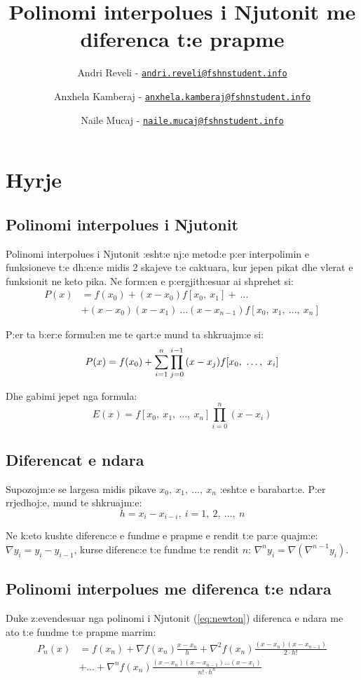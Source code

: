 \documentclass[12pt, margin=1in, a4paper]{article}
\title{Polinomi interpolues i Njutonit me diferenca t:e prapme}
\author{
    Andri Reveli - \href{mailto:andri.reveli@fshnstudent.info}{\texttt{andri.reveli@fshnstudent.info}}
    \and
    Anxhela Kamberaj - \href{mailto:anxhela.kamberaj@fshnstudent.info}{\texttt{anxhela.kamberaj@fshnstudent.info}}
    \and
    Naile Mucaj - \href{mailto:naile.mucaj@fshnstudent.info}{\texttt{naile.mucaj@fshnstudent.info}}
    \and
}
\begin{document}
\maketitle
\newpage

\tableofcontents
\newpage

\section{Hyrje}
  \subsection{Polinomi interpolues i Njutonit}
  Polinomi interpolues i Njutonit :esht:e nj:e metod:e p:er interpolimin e
  funksioneve t:e dh:en:e midis 2 skajeve t:e caktuara, kur jepen pikat dhe
  vlerat e funksionit ne keto pika. Ne form:en e p:ergjith:esuar ai
  shprehet si:
  \begin{equation}\label{eq:newton}
  \begin{aligned}
    P(x) &= f(x_0) + (x - x_0)f[x_0, \ x_1] + \ \dots \\
    &+ (x - x_0)(x - x_1) \ \dots (x - x_{n - 1})f[x_0, \ x_1, \ \dots, \ x_n]
  \end{aligned}
  \end{equation}

  P:er ta b:er:e formul:en me te qart:e mund ta shkruajm:e si:
  \[
    P(x) = f(x_0) + \sum_{i = 1}^{n}{\prod_{j = 0}^{i - 1}{(x - x_j)}f[x_0, \ \dots, \ x_i]} \\
  \]

  Dhe gabimi jepet nga formula:
  \[
    E(x) = f[x_0, \ x_1, \ \dots, \ x_n]\prod_{i = 0}^n{(x - x_i)}
  \]

  \subsection{Diferencat e ndara}
  Supozojm:e se largesa midis pikave \(x_0, \ x_1, \ \dots, \ x_n\) :esht:e e
  barabart:e. P:er rrjedhoj:e, mund te shkruajm:e:
  \[
    h = x_i - x_{i - i}, \ i = 1, \ 2, \ \dots, \ n
  \]

  Ne k:eto kushte diferenc:e e fundme e prapme e rendit t:e par:e quajm:e:
  \(\nabla y_i = y_i - y_{i - 1}\), kurse diferenc:e t:e fundme t:e rendit \(n\):
  \(\nabla^ny_i = \nabla(\nabla^{n - 1}y_i)\).

  \subsection{Polinomi interpolues me diferenca t:e ndara}
  Duke z:evendesuar nga polinomi i Njutonit (\ref{eq:newton}) diferenca e ndara me
  ato t:e fundme t:e prapme marrim:
  \begin{equation}
  \begin{aligned}
    P_n(x) &= f(x_n) + \nabla f(x_n)\frac{x - x_n}{h} + \nabla^2f(x_n)\frac{(x - x_n)(x - x_{n - 1})}{2 \cdot h!} \\
    &+ \dots + \nabla^n f(x_n)\frac{(x - x_n)(x - x_{n - 1}) \dots (x - x_1)}{n! \cdot h^n}
  \end{aligned}
  \end{equation}
\end{document}
